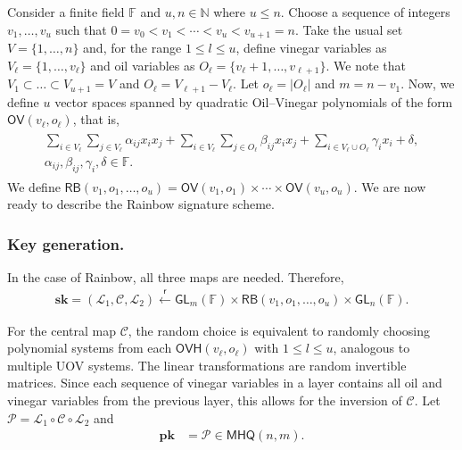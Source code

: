 \documentclass[draft, 12pt, a4paper, oneside]{memoir}
\newcommand{\random}{\overset{\mathsf{r}}{\gets}}
\theoremstyle{definition}
\begin{document}
Consider a finite field $\mathbb{F}$ and $u, n \in \mathbb{N}$ where $u \leq n$. Choose a sequence of integers $v_{1}, \dots, v_{u}$ such that $0 = v_{0} < v_{1} < \cdots < v_{u} < v_{u + 1} = n$. Take the usual set $V = \{1, \dots, n\}$ and, for the range $1 \leq l \leq u$, define vinegar variables as $V_{\ell} = \{1, \dots, v_{\ell}\}$ and oil variables as $O_{\ell} = \{v_{\ell} + 1, \dots, v_{\ell + 1}\}$. We note that $V_{1} \subset \dots \subset V_{u + 1} = V$ and $O_{\ell} = V_{\ell + 1} - V_{\ell}$. Let $o_{\ell} = |O_{\ell}|$ and $m = n - v_{1}$. Now, we define $u$ vector spaces spanned by quadratic Oil--Vinegar polynomials of the form $\mathsf{OV}(v_{\ell}, o_{\ell})$, that is,
\begin{align}\label{eq:ov}
  \begin{split}
    \sum_{i \in V_{\ell}} \sum_{j \in V_{\ell}} \alpha_{ij} x_{i} x_{j}
      + \sum_{i \in V_{\ell}} \sum_{j \in O_{\ell}} \beta_{ij} x_{i} x_{j}
      + \sum_{i \in V_{\ell} \cup O_{\ell}} \gamma_{i} x_{i} + \delta, \\
      \alpha_{ij}, \beta_{ij}, \gamma_{i}, \delta \in \mathbb{F}.
  \end{split}
\end{align}
We define $\mathsf{RB}(v_{1}, o_{1}, \dots, o_{u}) = \mathsf{OV}(v_{1}, o_{1}) \times \cdots \times \mathsf{OV}(v_{u}, o_{u})$. We are now ready to describe the Rainbow signature scheme.

\subsubsection{Key generation.}

In the case of Rainbow, all three maps are needed. Therefore,
\begin{align}
  \mathbf{sk} = (\mathcal{L}_{1}, \mathcal{C}, \mathcal{L}_{2}) 
    \random \mathsf{GL}_{m}(\mathbb{F}) \times \mathsf{RB}(v_{1}, o_{1}, \dots, o_{u}) \times \mathsf{GL}_{n}(\mathbb{F}).
\end{align}

For the central map $\mathcal{C}$, the random choice is equivalent to randomly choosing polynomial systems from each $\mathsf{OVH}(v_{\ell}, o_{\ell})$ with $1 \leq l \leq u$, analogous to multiple UOV systems. The linear transformations are random invertible matrices. Since each sequence of vinegar variables in a layer contains all oil and vinegar variables from the previous layer, this allows for the inversion of $\mathcal{C}$. Let $\mathcal{P} = \mathcal{L}_{1} \circ \mathcal{C} \circ \mathcal{L}_{2}$ and
\begin{align}
  \mathbf{pk} &= \mathcal{P} \in \mathsf{MHQ}(n, m).
\end{align}
\end{document}
